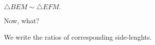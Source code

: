














$\triangle BEM \sim \triangle EFM.$

Now, what?





We write the ratios of corresponding side-lenghts.

